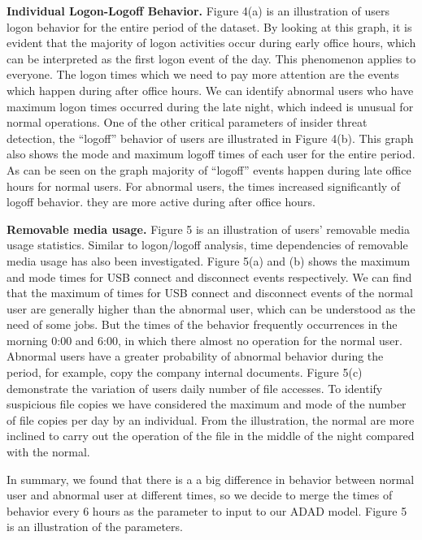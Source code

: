\documentclass[conference]{IEEEtran}
\begin{document}
\iffalse
\textbf{Individual Logon-Logoff Behavior.} Figure 4(a) is an illustration of users logon behavior for the
entire period of the dataset. By looking at this graph, it is evident that the majority of logon activities occur during early office hours, which can be interpreted as the first logon event of the day. This phenomenon applies to everyone.  The logon times which we need to pay more attention are the events which happen during after office hours. We can identify abnormal users who have maximum logon times occurred during the late night, which indeed is unusual for normal operations. One of the other critical parameters of insider threat detection, the “logoff” behavior of users are illustrated in Figure 4(b). This graph also shows the mode and maximum logoff times of each user for the entire period. As can be seen on the graph majority of “logoff” events happen during late office hours for normal users. For abnormal users, the times increased significantly of logoff behavior. they are more active during after office hours.

\textbf{Removable media usage.} Figure 5 is an illustration of users’ removable media usage statistics.
Similar to logon/logoff analysis, time dependencies of removable media usage has also been investigated. Figure 5(a) and (b) shows the maximum and mode times for USB connect and disconnect events respectively. We can find that the maximum of times for USB connect and disconnect events of the normal user are generally higher than the abnormal user, which can be understood as the need of some jobs. But the times of the behavior frequently occurrences in the morning 0:00 and 6:00, in which  there almost no operation for the normal user.  Abnormal users have a greater probability of abnormal behavior during the period, for example, copy the company internal documents.
Figure 5(c) demonstrate the variation of users daily number of file accesses. To identify suspicious file copies we have considered the maximum and mode of the number of file copies per day by an individual. From the illustration, the normal are more inclined to carry out the operation of the file in the middle of the night compared with the normal.


In summary, we found that there is a a big difference in behavior between normal user and abnormal user at different times, so we decide to merge the times of behavior every 6 hours as the parameter to input to our ADAD model. Figure 5 is an illustration of the parameters.
\end{document}
